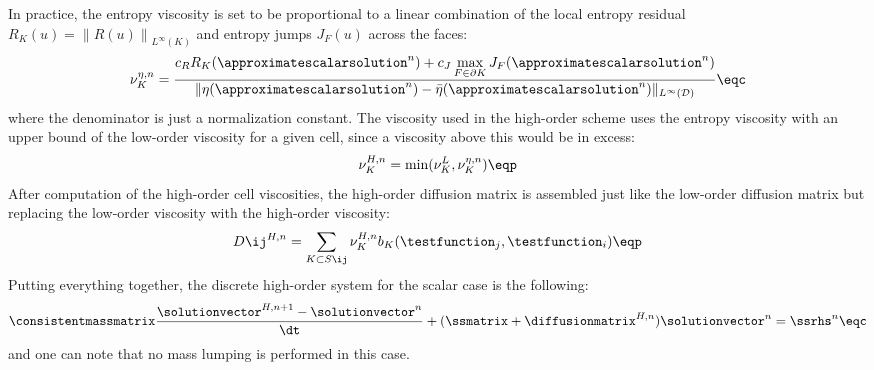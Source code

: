 In practice, the entropy viscosity is set to be proportional to a linear
combination of the local entropy residual $R_K(u) =
\left\|R(u)\right\|_{L^\infty(K)}$ and entropy jumps $J_F(u)$ across the faces:
\begin{equation}
  \nu^{\eta,n}_K = \frac{c_R R_K(\approximatescalarsolution^n)
    + c_J\max\limits_{F\in\partial K}J_F(\approximatescalarsolution^n)}
    {\|\eta(\approximatescalarsolution^n)-\bar{\eta}(\approximatescalarsolution^n)\|_{L^\infty(\mathcal{D})}} \eqc
\end{equation}
where the denominator is just a normalization constant. The viscosity used
in the high-order scheme uses the entropy viscosity with an upper bound
of the low-order viscosity for a given cell, since a viscosity above
this would be in excess:
\begin{equation}
  \nu^{H,n}_K = \min(\nu^{L}_K,\nu^{\eta,n}_K) \eqp
\end{equation}
After computation of the high-order cell viscosities, the high-order diffusion
matrix is assembled just like the low-order diffusion matrix but replacing
the low-order viscosity with the high-order viscosity:
\begin{equation}
  D\ij^{H,n} = \sum\limits_{K\subset S\ij}\nu_K^{H,n}
    b_K(\testfunction_j,\testfunction_i) \eqp
\end{equation}
Putting everything together, the discrete high-order system for the scalar
case is the following:
\begin{equation}
  \consistentmassmatrix\frac{\solutionvector^{H,n+1}
    -\solutionvector^n}{\dt} + (\ssmatrix + \diffusionmatrix^{H,n})
    \solutionvector^n = \ssrhs^n \eqc
\end{equation}
and one can note that no mass lumping is performed in this case.

